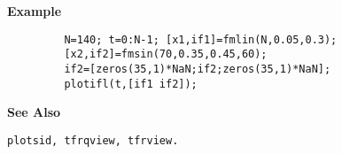 {\bf \large {}\selectfont Example}
\begin{verbatim}
         N=140; t=0:N-1; [x1,if1]=fmlin(N,0.05,0.3); 
         [x2,if2]=fmsin(70,0.35,0.45,60);
         if2=[zeros(35,1)*NaN;if2;zeros(35,1)*NaN];
         plotifl(t,[if1 if2]);
\end{verbatim}
\vspace*{.5cm}


{\bf \large {}\selectfont See Also}\\
\hspace*{1.5cm}
\begin{minipage}[t]{13.5cm}
\begin{verbatim}
plotsid, tfrqview, tfrview.
\end{verbatim}
\end{minipage}

 
